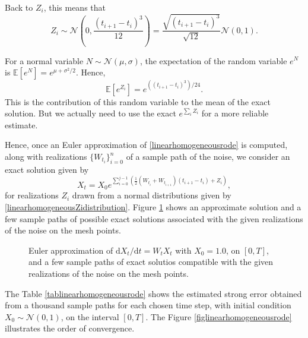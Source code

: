 \documentclass[reqno,12pt]{amsart}
\theoremstyle{plain}%
\theoremstyle{definition}
\begin{document}
Back to $Z_i$, this means that
\begin{equation}
    \label{linearhomogeneousZidistribution}
    Z_i \sim \mathcal{N}\left(0, \frac{(t_{i+1}- t_i)^3}{12}\right) = \frac{\sqrt{(t_{i+1} - t_i)^3}}{\sqrt{12}}\mathcal{N}(0, 1).
\end{equation}

For a normal variable $N \sim \mathcal{N}(\mu, \sigma)$, the expectation of the random variable $e^N$ is $\mathbb{E}[e^N] = e^{\mu + \sigma^2/2}$. Hence,
\begin{equation}
    \mathbb{E}[e^{Z_i}] = e^{((t_{i+1}- t_i)^3)/24}.
\end{equation}
This is the contribution of this random variable to the mean of the exact solution. But we actually need to use the exact $e^{\sum_i Z_i}$ for a more reliable estimate.

Hence, once an Euler approximation of \eqref{linearhomogeneousrode} is computed, along with realizations $\{W_{t_i}\}_{i=0}^n$ of a sample path of the noise, we consider an exact solution given by
\begin{equation}
    \label{Xtlinearhomogeneousrode}
    X_t = X_0 e^{\sum_{i = 0}^{j-1}\left(\frac{1}{2}\left(W_{t_i} + W_{t_{i+1}}\right)(t_{i+1} - t_i) + Z_i\right)},
\end{equation}
for realizations $Z_i$ drawn from a normal distributions given by \eqref{linearhomogeneousZidistribution}. Figure \ref{samplepathslinearhomogeneousrode} shows an approximate solution and a few sample paths of possible exact solutions associated with the given realizations of the noise on the mesh points.
\begin{figure}
    \label{samplepathslinearhomogeneousrode}
    \caption{Euler approximation of $\mathrm{d}X_t/\mathrm{d}t = W_t X_t$ with $X_0 = 1.0$, on $[0, T]$, and a few sample paths of exact solutios compatible with the given realizations of the noise on the mesh points.}
\end{figure}

The Table \ref{tablinearhomogeneousrode} shows the estimated strong error obtained from a thousand sample paths for each chosen time step, with initial condition $X_0 \sim \mathcal{N}(0, 1)$, on the interval $[0, T]$. The Figure \ref{figlinearhomogeneousrode} illustrates the order of convergence.
\end{document}
